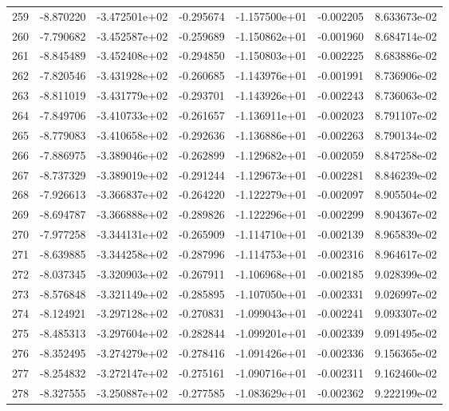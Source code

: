 \begin{tabular}{rrrrrrr}
 259 &  -8.870220 & -3.472501e+02 & -0.295674 & -1.157500e+01 &   -0.002205 &  8.633673e-02 \\
 260 &  -7.790682 & -3.452587e+02 & -0.259689 & -1.150862e+01 &   -0.001960 &  8.684714e-02 \\
 261 &  -8.845489 & -3.452408e+02 & -0.294850 & -1.150803e+01 &   -0.002225 &  8.683886e-02 \\
 262 &  -7.820546 & -3.431928e+02 & -0.260685 & -1.143976e+01 &   -0.001991 &  8.736906e-02 \\
 263 &  -8.811019 & -3.431779e+02 & -0.293701 & -1.143926e+01 &   -0.002243 &  8.736063e-02 \\
 264 &  -7.849706 & -3.410733e+02 & -0.261657 & -1.136911e+01 &   -0.002023 &  8.791107e-02 \\
 265 &  -8.779083 & -3.410658e+02 & -0.292636 & -1.136886e+01 &   -0.002263 &  8.790134e-02 \\
 266 &  -7.886975 & -3.389046e+02 & -0.262899 & -1.129682e+01 &   -0.002059 &  8.847258e-02 \\
 267 &  -8.737329 & -3.389019e+02 & -0.291244 & -1.129673e+01 &   -0.002281 &  8.846239e-02 \\
 268 &  -7.926613 & -3.366837e+02 & -0.264220 & -1.122279e+01 &   -0.002097 &  8.905504e-02 \\
 269 &  -8.694787 & -3.366888e+02 & -0.289826 & -1.122296e+01 &   -0.002299 &  8.904367e-02 \\
 270 &  -7.977258 & -3.344131e+02 & -0.265909 & -1.114710e+01 &   -0.002139 &  8.965839e-02 \\
 271 &  -8.639885 & -3.344258e+02 & -0.287996 & -1.114753e+01 &   -0.002316 &  8.964617e-02 \\
 272 &  -8.037345 & -3.320903e+02 & -0.267911 & -1.106968e+01 &   -0.002185 &  9.028399e-02 \\
 273 &  -8.576848 & -3.321149e+02 & -0.285895 & -1.107050e+01 &   -0.002331 &  9.026997e-02 \\
 274 &  -8.124921 & -3.297128e+02 & -0.270831 & -1.099043e+01 &   -0.002241 &  9.093307e-02 \\
 275 &  -8.485313 & -3.297604e+02 & -0.282844 & -1.099201e+01 &   -0.002339 &  9.091495e-02 \\
 276 &  -8.352495 & -3.274279e+02 & -0.278416 & -1.091426e+01 &   -0.002336 &  9.156365e-02 \\
 277 &  -8.254832 & -3.272147e+02 & -0.275161 & -1.090716e+01 &   -0.002311 &  9.162460e-02 \\
 278 &  -8.327555 & -3.250887e+02 & -0.277585 & -1.083629e+01 &   -0.002362 &  9.222199e-02 \\

\end{tabular}
